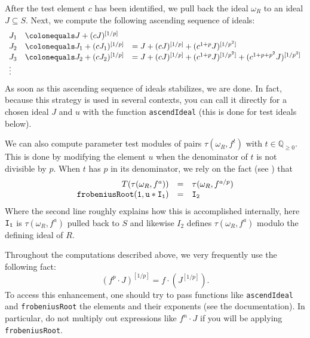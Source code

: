 \documentclass{amsart}
\renewcommand{\geq}{\geqslant}
\begin{document}
After the test element $c$ has been identified, we pull back the ideal $\omega_R$ to an ideal $J \subseteq S$.  Next, we compute the following ascending sequence of ideals:
\begin{equation}
\label{eq.AscendIdealExplanation}
\begin{array}{lll}
J_1 &\colonequals   J + (c J)^{[1/p]} & \\
J_2 &\colonequals   J_1 + (c J_1)^{[1/p]} & = J + (c J)^{[1/p]} + (c^{1+p} J)^{[1/p^2]} \\
J_3 &\colonequals    J_2 + (cJ_2)^{[1/p]} & = J + (c J)^{[1/p]} + (c^{1+p} J)^{[1/p^2]} + (c^{1+p+p^2} J)^{[1/p^3]} \\
\vdots
\end{array}
\end{equation}
As soon as this ascending sequence of ideals stabilizes, we are done.
In fact, because this strategy is used in several contexts, you can call it directly for a chosen ideal $J$ and $u$ with the function \texttt{ascendIdeal} (this is done for test ideals below).

We can also compute parameter test modules of pairs $\tau(\omega_R, f^{t})$ with $t \in \mathbb{Q}_{\geq 0}$.  This is done by modifying the element $u$ when the denominator of $t$ is not divisible by $p$.  When $t$ has $p$ in its denominator, we rely on the fact (see \cite{BlickleMustataSmithDiscretenessAndRationalityOfFThresholds,SchwedeTuckerTestIdealFiniteMaps}) that
\[
\begin{array}{rcl}
T(\tau(\omega_R, f^a)) & = & \tau(\omega_R, f^{a/p})\\
{\tt frobeniusRoot(1, u*I_1)} & {\tt =} & {\tt I_2}
\end{array}
\]
Where the second line roughly explains how this is accomplished internally, here ${\tt I_1}$ is $\tau(\omega_R, f^a)$ pulled back to $S$ and likewise $I_2$ defines $\tau(\omega_R, f^a)$ modulo the defining ideal of $R$.

\begin{remark}
Throughout the computations described above, we very frequently use the following fact:
\[
(f^p \cdot J)^{[1/p]} = f \cdot (J^{[1/p]}).
\]
To access this enhancement, one should try to pass functions like \texttt{ascendIdeal} and \texttt{frobeniusRoot} the elements and their exponents (see the documentation).  In particular, do not multiply out expressions like $f^n \cdot J$ if you will be applying \texttt{frobeniusRoot}.
\end{remark}
\end{document}
